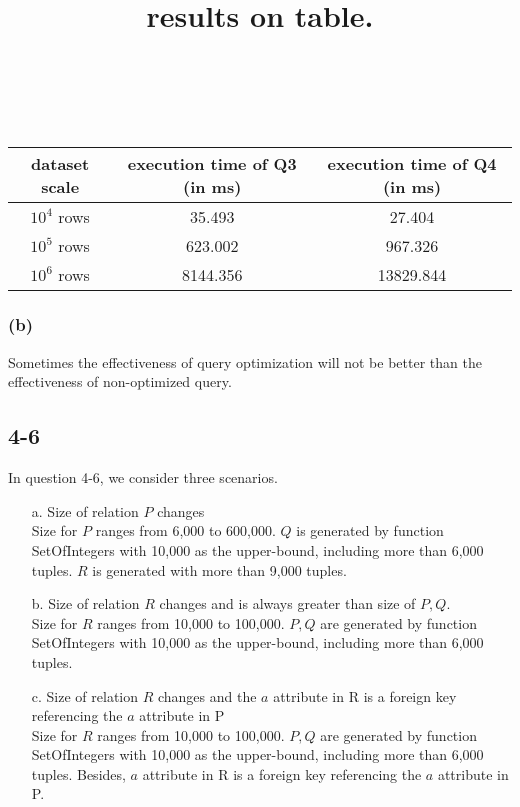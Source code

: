 \documentclass[10pt]{article}
\begin{document}
\begin{center}
\title{results on table.}
\\ \hspace*{\fill} \\
\begin{tabular}{c|c|c}
\hline
dataset scale & execution time of Q3 (in ms) & execution time of Q4 (in ms) \\ \hline
$10^4$ rows &  35.493 & 27.404 \\
$10^5$ rows & 623.002 & 967.326 \\
$10^6$ rows & 8144.356 & 13829.844 \\
\hline
\end{tabular}
\end{center}
\subsubsection*{(b)}
Sometimes  the effectiveness of query optimization will not be better than the effectiveness of non-optimized query.
\subsection*{4-6}
In question 4-6, we consider three scenarios.
\begin{itemize}
\item[a.] Size of relation $P$ changes\\
Size for $P$ ranges from 6,000 to 600,000. $Q$ is generated by function SetOfIntegers with 10,000 as the upper-bound, including more than 6,000 tuples. $R$ is generated with more than 9,000 tuples.

\item[b.] Size of relation $R$ changes and is always greater than size of $P,Q$.\\
Size for $R$ ranges from 10,000 to 100,000. $P, Q$ are generated by function SetOfIntegers with 10,000 as the upper-bound, including more than 6,000 tuples.


\item[c.] Size of relation $R$ changes and the $a$ attribute in R is a foreign key referencing the $a$ attribute in P\\
Size for $R$ ranges from 10,000 to 100,000. $P, Q$ are generated by function SetOfIntegers with 10,000 as the upper-bound, including more than 6,000 tuples. Besides, $a$ attribute in R is a foreign key referencing the $a$ attribute in P.

\end{itemize}
\end{document}
